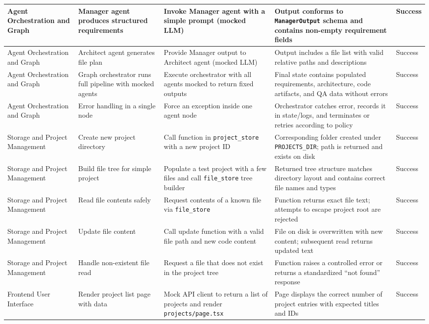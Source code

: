 \begin{longtable}{|p{3.0cm}|p{3.8cm}|p{3.8cm}|p{4.6cm}|>{\centering\arraybackslash}p{1.8cm}|}
\hline
Agent Orchestration and Graph & Manager agent produces structured requirements & Invoke Manager agent with a simple prompt (mocked LLM) & Output conforms to \texttt{ManagerOutput} schema and contains non-empty requirement fields & Success \\
\hline
Agent Orchestration and Graph & Architect agent generates file plan & Provide Manager output to Architect agent (mocked LLM) & Output includes a file list with valid relative paths and descriptions & Success \\
\hline
Agent Orchestration and Graph & Graph orchestrator runs full pipeline with mocked agents & Execute orchestrator with all agents mocked to return fixed outputs & Final state contains populated requirements, architecture, code artifacts, and QA data without errors & Success \\
\hline
Agent Orchestration and Graph & Error handling in a single node & Force an exception inside one agent node & Orchestrator catches error, records it in state/logs, and terminates or retries according to policy & Success \\
\hline
Storage and Project Management & Create new project directory & Call function in \texttt{project\_\allowbreak{}store} with a new project ID & Corresponding folder created under \texttt{PROJECTS\_\allowbreak{}DIR}; path is returned and exists on disk & Success \\
\hline
Storage and Project Management & Build file tree for simple project & Populate a test project with a few files and call \texttt{file\_\allowbreak{}store} tree builder & Returned tree structure matches directory layout and contains correct file names and types & Success \\
\hline
Storage and Project Management & Read file contents safely & Request contents of a known file via \texttt{file\_\allowbreak{}store} & Function returns exact file text; attempts to escape project root are rejected & Success \\
\hline
Storage and Project Management & Update file content & Call update function with a valid file path and new code content & File on disk is overwritten with new content; subsequent read returns updated text & Success \\
\hline
Storage and Project Management & Handle non-existent file read & Request a file that does not exist in the project tree & Function raises a controlled error or returns a standardized ``not found'' response & Success \\
\hline
Frontend User Interface & Render project list page with data & Mock API client to return a list of projects and render \texttt{projects/\allowbreak{}page.tsx} & Page displays the correct number of project entries with expected titles and IDs & Success \\

\end{longtable}
